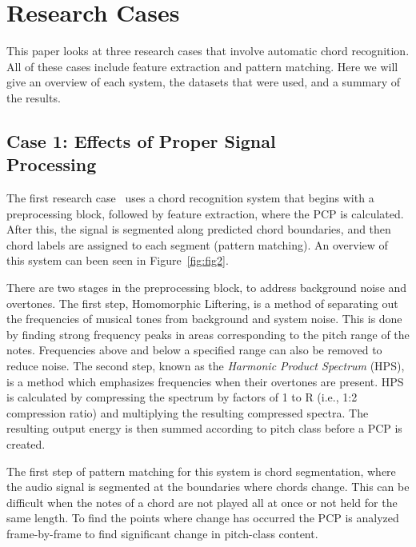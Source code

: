 \documentclass{sig-alternate}
\begin{document}
\section{Research Cases}

This paper looks at three research cases that involve automatic chord recognition. All of these cases include feature extraction and pattern matching. Here we will give an overview of each system, the datasets that were used, and a summary of the results.


\subsection{Case 1: Effects of Proper Signal \\ Processing}

The first research case~\cite{Morman:2006} uses a chord recognition system that begins with a preprocessing block, followed by feature extraction, where the PCP is calculated. After this, the signal is segmented along predicted chord boundaries, and then chord labels are assigned to each segment (pattern matching). An overview of this system can been seen in Figure~\ref{fig:fig2}. 

There are two stages in the preprocessing block, to address background noise and overtones. The first step, Homomorphic Liftering, is a method of separating out the frequencies of musical tones from background and system noise. This is done by finding strong frequency peaks in areas corresponding to the pitch range of the notes. Frequencies above and below a specified range can also be removed to reduce noise. The second step, known as the \textit{Harmonic Product Spectrum} (HPS), is a method which emphasizes frequencies when their overtones are present. HPS is calculated by compressing the spectrum by factors of 1 to R (i.e., 1:2 compression ratio) and multiplying the resulting compressed spectra. The resulting output energy is then summed according to pitch class before a PCP is created.


The first step of pattern matching for this system is chord segmentation, where the audio signal is segmented at the boundaries where chords change. This can be difficult when the notes of a chord are not played all at once or not held for the same length. To find the points where change has occurred the PCP is analyzed frame-by-frame to find significant change in pitch-class content. 
\end{document}
